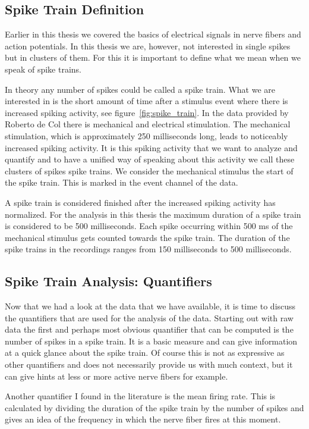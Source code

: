 \subsection{Spike Train Definition}
Earlier in this thesis we covered the basics of electrical signals in nerve fibers and action potentials. In this thesis we are, however, not interested in single spikes but in clusters of them. For this it is important to define what we mean when we speak of spike trains.

In theory any number of spikes could be called a spike train. What we are interested in is the short amount of time after a stimulus event where there is increased spiking activity, see figure~\ref{fig:spike_train}. In the data provided by Roberto de Col there is mechanical and electrical stimulation. The mechanical stimulation, which is approximately 250 milliseconds long, leads to noticeably increased spiking activity. It is this spiking activity that we want to analyze and quantify and to have a unified way of speaking about this activity we call these clusters of spikes spike trains. We consider the mechanical stimulus the start of the spike train. This is marked in the event channel of the data. 

A spike train is considered finished after the increased spiking activity has normalized. For the analysis in this thesis the maximum duration of a spike train is considered to be 500 milliseconds. Each spike occurring within 500 ms of the mechanical stimulus gets counted towards the spike train. The duration of the spike trains in the recordings ranges from 150 milliseconds to 500 milliseconds.

\subsection{Spike Train Analysis: Quantifiers}
Now that we had a look at the data that we have available, it is time to discuss the quantifiers that are used for the analysis of the data.
Starting out with raw data the first and perhaps most obvious quantifier that can be computed is the number of spikes in a spike train. It is a basic measure and can give information at a quick glance about the spike train. Of course this is not as expressive as other quantifiers and does not necessarily provide us with much context, but it can give hints at less or more active nerve fibers for example. 

Another quantifier I found in the literature is the mean firing rate. This is calculated by dividing the duration of the spike train by the number of spikes and gives an idea of the frequency in which the nerve fiber fires at this moment.

